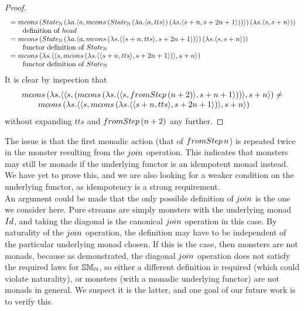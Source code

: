 \begin{proof}
$$\begin{array}{l}
{}=  \mcons\, (\state_{\nat}\,(\lambda a . \pair{a}{  
\mcons\, (\state_{\nat} \,(\lambda a . \pair{a}{tts})\, (\lambda s . \pair{s + n}{s + 2n + 1}))
})\, (\lambda s. \pair{s}{s + n}))
\\ \qquad\mbox{definition of } \head \\
{}= \mcons\, (\state_{\nat}\,(\lambda a . \pair{a}{  
\mcons\, (\lambda s . \pair{\pair{s + n}{tts}}{s + 2n + 1})
})\, (\lambda s. \pair{s}{s + n})) \\
\qquad\mbox{functor definition of } \state_{\nat}  \\
{}= \mcons\, (\lambda s. \pair{\pair{s}{\mcons\, (\lambda s . \pair{\pair{s + n}{tts}}{s + 2n + 1})}}{s + n}) \\ 
\qquad\mbox{functor definition of } \state_{\nat} \\
\end{array} 
$$
It is clear by inspection that 
$$
\begin{array}{l}
\mcons\, (\lambda s. \pair{\pair{s}{(\mcons\, (\lambda s. \pair{\pair{s}{\fromstepstr\, (n + 2)}}{s + n + 1}))}}{s + n}) \neq \\
\qquad \mcons\, (\lambda s. \pair{\pair{s}{\mcons\, (\lambda s . \pair{\pair{s + n}{tts}}{s + 2n + 1})}}{s + n})
\end{array} 
$$
without expanding $tts$ and $\fromstepstr\, (n + 2)$ any further.
\end{proof}

The issue is that the first monadic action (that of $\fromstepstr\, n$) is repeated twice in the monster resulting from the $\join$ operation. 
This indicates that monsters may still be monads if the underlying functor is an idempotent monad instead. 
We have yet to prove this, and we are also looking for a weaker condition on the underlying functor, as idempotency is a strong requirement. \\

An argument could be made that the only possible definition of $\join$ is the one we consider here. Pure streams are simply monsters with the underlying monad $\Id$, and taking the diagonal is the canonical $\join$ operation in this case. By naturality of the $\join$ operation, the definition may have to be independent of the particular underlying monad chosen. If this is the case, then monsters are not monads, because as demonstrated, the diagonal $\join$ operation does not satisfy the required laws for $\mathbb{SM}_{\mathbb{N}}$, so either a different definition is required (which could violate naturality), or monsters (with a monadic underlying functor) are not monads in general. We suspect it is the latter, and one goal of our future work is to verify this.
